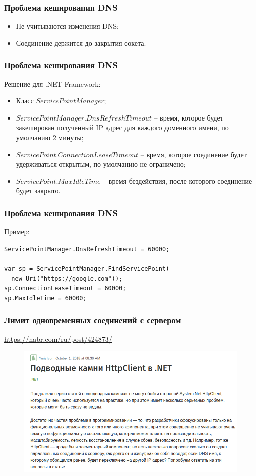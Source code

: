 \documentclass{beamer}
\begin{document}
\begin{frame}
\frametitle{Проблема кеширования DNS}
\begin{itemize}
	\item Не учитываются изменения DNS;
	\item Соединение держится до закрытия сокета.
\end{itemize}
\end{frame}

\begin{frame}
\frametitle{Проблема кеширования DNS}
Решение для .NET Framework:
\begin{itemize}
	\item Класс $ServicePointManager$;
	\item $ServicePointManager.DnsRefreshTimeout$ -- время, которое будет закеширован полученный IP адрес для каждого доменного имени, по умолчанию 2 минуты;
	\item $ServicePoint.ConnectionLeaseTimeout$ -- время, которое соединение будет удерживаться открытым, по умолчанию не ограничено;
	\item $ServicePoint.MaxIdleTime$ -- время бездействия, после которого соединение будет закрыто.
\end{itemize}
\end{frame}

\begin{frame}[fragile]
\frametitle{Проблема кеширования DNS}
Пример:
\\
\begin{lstlisting}
ServicePointManager.DnsRefreshTimeout = 60000;

var sp = ServicePointManager.FindServicePoint(
  new Uri("https://google.com"));
sp.ConnectionLeaseTimeout = 60000;
sp.MaxIdleTime = 60000;
\end{lstlisting}
\end{frame}

\begin{frame}
\frametitle{Лимит одновременных соединений с сервером}
\href{https://habr.com/ru/post/424873/}{https://habr.com/ru/post/424873/}
\begin{figure}
\includegraphics[scale=0.4]{habr}
\end{figure}
\end{frame}
\end{document}
